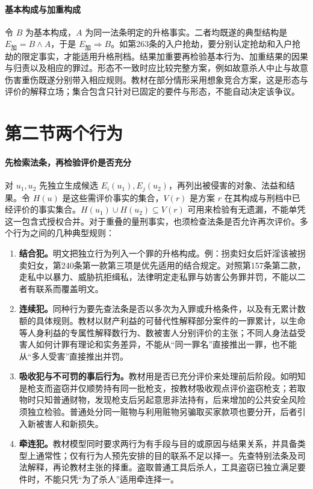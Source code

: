 \paragraph{基本构成与加重构成}
令 \(B\) 为基本构成，\(A\) 为同一法条明定的升格事实。二者均既遂的典型结构是 \(E_{\text{加}}=B\land A\)，于是 \(E_{\text{加}}\Rightarrow B\)。如第263条的入户抢劫，要分别认定抢劫和入户抢劫的限定事实，才能适用升格刑档。结果加重要再检验基本行为、加重结果的因果与归责以及相应的罪过。形态不一致时应比较完整方案，例如故意杀人中止与故意伤害重伤既遂分别带入相应规则。教材在部分情形采用想象竞合方案，这是形态与评价的解释立场；集合包含只针对已固定的要件与形态，不能自动决定该争议。

\section{第二节\quad 两个行为}
\paragraph{先检索法条，再检验评价是否充分}
对 \(u_1,u_2\) 先独立生成候选 \(E_i(u_1),E_j(u_2)\)，再列出被侵害的对象、法益和结果。令 \(H(u)\) 是这些需评价事实的集合，\(V(r)\) 是方案 \(r\) 在其构成与刑档中已经评价的事实集合。\(H(u_1)\cup H(u_2)\subseteq V(r)\) 可用来检验有无遗漏，不能单凭这一包含式授权合并。对于重叠的量刑事实，也须检查法条是否允许再次评价。多个行为之间的几种典型规则：
\begin{enumerate}
 \item \textbf{结合犯。}明文把独立行为列入一个罪的升格构成。例：拐卖妇女后奸淫该被拐卖妇女，第240条第一款第三项是优先适用的结合规定。对照第157条第二款，走私中以暴力、威胁抗拒缉私，法律明定走私罪与妨害公务罪并罚，不能以二者有联系而覆盖明文。
 \item \textbf{连续犯。}同种行为要先查法条是否以多次为入罪或升格条件，以及有无累计数额的具体规则。教材以财产利益的可替代性解释部分案件的一罪累计，以生命等人身利益的专属性解释数行为、数被害人分别评价的主张；不同人身法益受害人如何计罪有理论和实务差异，不能从“同一罪名”直接推出一罪，也不能从“多人受害”直接推出并罚。
 \item \textbf{吸收犯与不可罚的事后行为。}教材用是否已充分评价来处理前后阶段。如明知是枪支而盗窃并仅顺势持有同一批枪支，按教材吸收观点评价盗窃枪支；若取物时只知普通财物，发现枪支后另起意思非法持有，后来增加的公共安全风险须独立检验。普通处分同一赃物与利用赃物另骗取买家款项也要分开，后者引入新被害人和新损失。
 \item \textbf{牵连犯。}教材模型同时要求两行为有手段与目的或原因与结果关系，并具备类型上通常性；仅有行为人预先安排的目的联系不足以择一。先查特别法条及司法解释，再论教材主张的择重。盗取普通工具后杀人，工具盗窃已独立满足要件时，不能只凭“为了杀人”适用牵连择一。
\end{enumerate}

